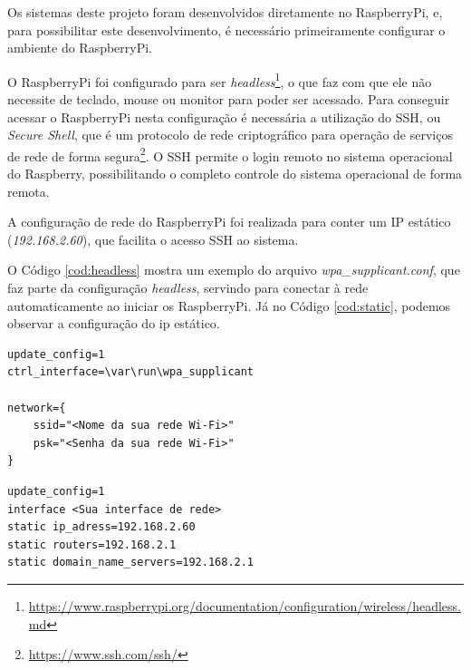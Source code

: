 Os sistemas deste projeto foram desenvolvidos diretamente no RaspberryPi, e, para possibilitar este desenvolvimento, é necessário primeiramente configurar o ambiente do RaspberryPi.

\newpage

O RaspberryPi foi configurado para ser \textit{headless}\footnote{\url{https://www.raspberrypi.org/documentation/configuration/wireless/headless.md}}, o que faz com que ele não necessite de teclado, mouse ou monitor para poder ser acessado. Para conseguir acessar o RaspberryPi nesta configuração é necessária a utilização do SSH, ou \textit{Secure Shell}, que é um protocolo de rede criptográfico para operação de serviços de rede de forma segura\footnote{\url{https://www.ssh.com/ssh/}}. O SSH permite o login remoto no sistema operacional do Raspberry, possibilitando o completo controle do sistema operacional de forma remota.

A configuração de rede do RaspberryPi foi realizada para conter um IP estático (\textit{192.168.2.60}), que facilita o acesso SSH ao sistema.

O Código \ref{cod:headless} mostra um exemplo do arquivo \textit{wpa\_supplicant.conf}, que faz parte da configuração \textit{headless}, servindo para conectar à rede automaticamente ao iniciar os RaspberryPi. Já no Código \ref{cod:static}, podemos observar a configuração do ip estático.

\begin{lstlisting}[caption=Exemplo de configuração \textit{headless}, label=cod:headless]
update_config=1
ctrl_interface=\var\run\wpa_supplicant

network={
    ssid="<Nome da sua rede Wi-Fi>"
    psk="<Senha da sua rede Wi-Fi>"
}
\end{lstlisting}

\begin{lstlisting}[caption=Exemplo de configuração do IP estático, label=cod:static]
update_config=1
interface <Sua interface de rede>
static ip_adress=192.168.2.60
static routers=192.168.2.1
static domain_name_servers=192.168.2.1
\end{lstlisting}



